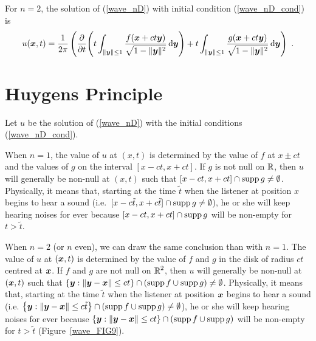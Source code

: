 
For $n=2$, the solution of (\ref{wave_nD}) with initial condition
(\ref{wave_nD_cond}) is
\[
u(\VEC{x},t) = \frac{1}{2\pi}
\left( \pdfdx{\left( t \int_{\|\VEC{y}\|\leq 1}
\frac{f(\VEC{x} + ct \VEC{y})}{\sqrt{1-\|\VEC{y}\|^2}} \dx{\VEC{y}} \right)}{t}
+ t \int_{\|\VEC{y}\|\leq 1}
\frac{g(\VEC{x}+ ct\VEC{y})}{\sqrt{1-\|\VEC{y}\|^2}} \dx{\VEC{y}}
\right) \ .
\]

\section{Huygens Principle}

Let $u$ be the solution of (\ref{wave_nD}) with the initial
conditions (\ref{wave_nD_cond}).

When $n=1$, the value of $u$ at $(x,t)$ is determined by the value of $f$
at $x\pm ct$ and the values of $g$ on the interval $[x-ct, x+ct]$.  If
$g$ is not null on $\RR$, then $u$ will generally be non-null at
$(x,t)$ such that $[x-ct, x+ct] \cap \supp g \neq \emptyset$.
Physically, it means that, starting at the time $\tilde{t}$ when the
listener at position $x$ begins to hear a sound
(i.e.\ $[x-c\tilde{t}, x+c\tilde{t}] \cap \supp g \neq \emptyset$),
he or she will keep hearing noises for ever
because $[x-ct, x+ct] \cap \supp g$ will be non-empty for $t>\tilde{t}$.

When $n=2$ (or $n$ even), we can draw the same conclusion than with
$n=1$.  The value of $u$ at $(\VEC{x},t)$ is determined by the value
of $f$ and $g$ in the disk of radius $ct$ centred at $\VEC{x}$.  If
$f$ and $g$ are not null on $\DS \RR^2$, then $u$ will
generally be non-null at $(\VEC{x},t)$ such that
$\left\{ \VEC{y} : \|\VEC{y}-\VEC{x}\| \leq ct\right\}
\cap (\supp f \cup \supp g) \neq \emptyset$.
Physically, it means that, starting at the time $\tilde{t}$ when the
listener at position $\VEC{x}$ begins to hear a sound
(i.e. $\left\{ \VEC{y} : \|\VEC{y}-\VEC{x}\| \leq c\tilde{t}\right\}
\cap (\supp f \cup \supp g) \neq \emptyset$), he or she will keep
hearing noises for ever 
because $\left\{ \VEC{y} : \|\VEC{y}-\VEC{x}\| \leq ct\right\}
\cap (\supp f \cup \supp g)$
will be non-empty for $t>\tilde{t}$ (Figure~\ref{wave_FIG9}).

